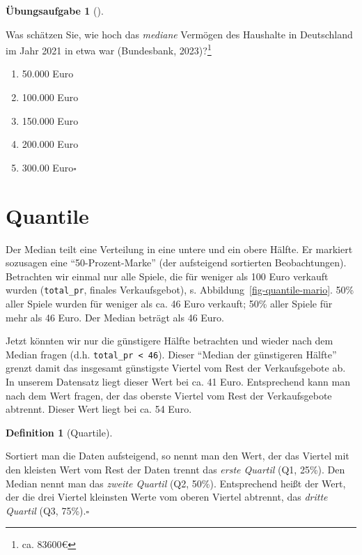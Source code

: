 \documentclass[
  letterpaper,
]{scrbook}
\providecommand{\tightlist}{%
  \setlength{\itemsep}{0pt}\setlength{\parskip}{0pt}}\usepackage{longtable,booktabs,array}
\theoremstyle{definition}
\theoremstyle{definition}
\newtheorem{definition}{Definition}[chapter]
\theoremstyle{definition}
\newtheorem{exercise}{Übungsaufgabe}[chapter]
\theoremstyle{remark}
\begin{document}
\begin{exercise}[]\protect\hypertarget{exr-mw-wealthmd}{}\label{exr-mw-wealthmd}

Was schätzen Sie, wie hoch das \emph{mediane} Vermögen des Haushalte in
Deutschland im Jahr 2021 in etwa war (Bundesbank, 2023)?\footnote{ca.
  83600€}

\begin{enumerate}
\def\labelenumi{\alph{enumi})}
\tightlist
\item
  50.000 Euro
\item
  100.000 Euro
\item
  150.000 Euro
\item
  200.000 Euro
\item
  300.00 Euro\(\square\)
\end{enumerate}

\end{exercise}

\section{Quantile}\label{quantile}

Der Median teilt eine Verteilung in eine untere und ein obere Hälfte. Er
markiert sozusagen eine ``50-Prozent-Marke'' (der aufsteigend sortierten
Beobachtungen). Betrachten wir einmal nur alle Spiele, die für weniger
als 100 Euro verkauft wurden (\texttt{total\_pr}, finales
Verkaufsgebot), s. Abbildung~\ref{fig-quantile-mario}. 50\% aller Spiele
wurden für weniger als ca. 46 Euro verkauft; 50\% aller Spiele für mehr
als 46 Euro. Der Median beträgt als 46 Euro.

Jetzt könnten wir nur die günstigere Hälfte betrachten und wieder nach
dem Median fragen (d.h. \texttt{total\_pr\ \textless{}\ 46}). Dieser
``Median der günstigeren Hälfte'' grenzt damit das insgesamt günstigste
Viertel vom Rest der Verkaufsgebote ab. In unserem Datensatz liegt
dieser Wert bei ca. 41 Euro. Entsprechend kann man nach dem Wert fragen,
der das oberste Viertel vom Rest der Verkaufsgebote abtrennt. Dieser
Wert liegt bei ca. 54 Euro.

\begin{definition}[Quartile]\protect\hypertarget{def-quartile}{}\label{def-quartile}

Sortiert man die Daten aufsteigend, so nennt man den Wert, der das
Viertel mit den kleisten Wert vom Rest der Daten trennt das \emph{erste
Quartil} (Q1, 25\%). Den Median nennt man das \emph{zweite Quartil} (Q2,
50\%). Entsprechend heißt der Wert, der die drei Viertel kleinsten Werte
vom oberen Viertel abtrennt, das \emph{dritte Quartil} (Q3,
75\%).\(\square\)

\end{definition}
\end{document}
